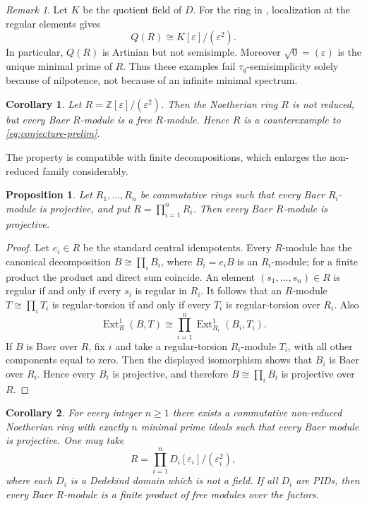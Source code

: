 \documentclass[11pt]{article}
\newtheorem{proposition}[proposition]{Proposition}
\newtheorem{corollary}[corollary]{Corollary}
\theoremstyle{definition}
\theoremstyle{remark}
\newtheorem{remark}[remark]{Remark}
\newcommand{\Ext}{\operatorname{Ext}}
\begin{document}
\begin{remark}\label{rem:totalquotientdual}
Let $K$ be the quotient field of $D$.  For the ring in
, localization at the regular elements gives
\[
 Q(R)\cong K[\varepsilon]/(\varepsilon^2).
\]
In particular, $Q(R)$ is Artinian but not semisimple.  Moreover
$\sqrt{0}=(\varepsilon)$ is the unique minimal prime of $R$.  Thus these
examples fail $\tau_q$-semisimplicity solely because of nilpotence, not because
of an infinite minimal spectrum.
\end{remark}

\begin{corollary}\label{prop:Zdual}
	Let $R=\mathbb Z[\varepsilon]/(\varepsilon^2)$.  Then the Noetherian ring $R$
	is not reduced, but every Baer $R$-module is a free $R$-module.  Hence $R$ is
	a counterexample to \eqref{eq:conjecture-prelim}.
\end{corollary}

The property is compatible with finite decompositions, which enlarges the
non-reduced family considerably.

\begin{proposition}\label{prop:finiteproductBaer}
Let $R_1,\ldots,R_n$ be commutative rings such that every Baer $R_i$-module is
projective, and put $R=\prod_{i=1}^nR_i$.  Then every Baer $R$-module is
projective.
\end{proposition}

\begin{proof}
Let $e_i\in R$ be the standard central idempotents.  Every $R$-module has the
canonical decomposition $B\cong\prod_i B_i$, where $B_i=e_iB$ is an
$R_i$-module; for a finite product the product and direct sum coincide.
An element $(s_1,\ldots,s_n)\in R$ is regular if and only if every $s_i$ is
regular in $R_i$.  It follows that an $R$-module $T\cong\prod_iT_i$ is
regular-torsion if and only if every $T_i$ is regular-torsion over $R_i$.
Also
\[
 \Ext_R^1(B,T)\cong\prod_{i=1}^n\Ext_{R_i}^1(B_i,T_i).
\]
If $B$ is Baer over $R$, fix $i$ and take a regular-torsion $R_i$-module
$T_i$, with all other components equal to zero.  Then the displayed
isomorphism shows that $B_i$ is Baer over $R_i$.  Hence every $B_i$ is
projective, and therefore $B\cong\prod_iB_i$ is projective over $R$.
\end{proof}

\begin{corollary}\label{cor:manyminimalnonreduced}
For every integer $n\ge1$ there exists a commutative non-reduced Noetherian
ring with exactly $n$ minimal prime ideals such that every Baer module is
projective.  One may take
\[
 R=\prod_{i=1}^n D_i[\varepsilon_i]/(\varepsilon_i^2),
\]
where each $D_i$ is a Dedekind domain which is not a field.  If all $D_i$ are
PIDs, then every Baer $R$-module is a finite product of free modules over the
factors.
\end{corollary}
\end{document}
